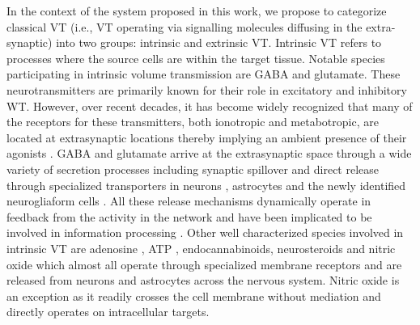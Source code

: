     In the context of the system proposed in this work, we propose to categorize classical VT (i.e., VT operating via signalling molecules diffusing in the extra-synaptic) into two groups: intrinsic and extrinsic VT. Intrinsic VT refers to processes where the source cells are within the target tissue. Notable species participating in intrinsic volume transmission are GABA and glutamate. These neurotransmitters are primarily known for their role in excitatory and inhibitory WT. However, over recent decades, it has become widely recognized that many of the receptors for these transmitters, both ionotropic and metabotropic, are located at extrasynaptic locations thereby implying an ambient presence of their agonists \cite{farrant2005variations,taber2014volume,wall1997development}. GABA and glutamate arrive at the extrasynaptic space through a wide variety of secretion processes including synaptic spillover \cite{matsui2003ectopic,hamann2002tonic,bellamy2006interactions} and direct release through specialized transporters in neurons \cite{cavelier2005tonic}, astrocytes \cite{lee2010channel,cavelier2005DIDS} and the newly identified neurogliaform cells \cite{olah2009regulation}. All these release mechanisms dynamically operate in feedback from the activity in the network and have been implicated to be involved in information processing \cite{mann2010control,hamann2002tonic,lenk2016understanding,cavelier2005tonic}. Other well characterized species involved in intrinsic VT are adenosine \cite{wall2015localized}, ATP \cite{zhang2003atp}, endocannabinoids, neurosteroids and nitric oxide \cite{fuxe2010discovery,bellamy2000rapid} which almost all operate through specialized membrane receptors and are released from neurons and astrocytes across the nervous system. Nitric oxide is an exception as it readily crosses the cell membrane without mediation and directly operates on intracellular targets.

